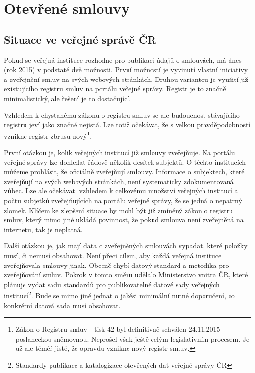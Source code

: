 \chapter{Otevřené smlouvy}
\label{sec:kap3}

\section{Situace ve veřejné správě ČR}

Pokud se veřejná instituce rozhodne pro publikaci údajů o smlouvách, má dnes (rok 2015) v podstatě dvě možnosti. První možností je vyvinutí vlastní iniciativy a zveřejnění smluv na svých webových stránkách. Druhou variantou je využití již existujícího registru smluv na portálu veřejné správy\cite{portalgov}. Registr je to značně minimalistický, ale řešení je to dostačující.

Vzhledem k chystanému zákonu o registru smluv se ale budoucnost stávajícího registru jeví jako značně nejistá. Lze totiž očekávat, že s velkou pravděpodobností vznikne registr zbrusu nový\footnote{Zákon o Registru smluv - tisk 42\cite{z42} byl definitivně schválen 24.11.2015 poslaneckou sněmovnou. Neprošel však ještě celým legislativním procesem. Je už ale téměř jisté, že opravdu vznikne nový registr smluv.}.

První otázkou je, kolik veřejných institucí již smlouvy zveřejňuje. Na portálu veřejné správy lze dohledat řádově několik desítek subjektů. O těchto institucích můžeme prohlásit, že oficiálně zveřejňují smlouvy. Informace o subjektech, které zveřejňují na svých webových stránkách, není systematicky zdokumentovaná vůbec. Lze ale očekávat, vzhledem k celkovému množství veřejných institucí a počtu subjetků zveřejňujících na portálu veřejné správy, že se jedná o nepatrný zlomek. Klíčem ke zlepšení situace by mohl být již zmíněný zákon o registru smluv, který mimo jiné ukládá povinnost, že pokud smlouva není zveřejněná na internetu, tak je neplatná.

Další otázkou je, jak mají data o zveřejněných smlouvách vypadat, které položky musí, či nemusí obsahovat. Není přeci cílem, aby každá veřejná instituce zveřejňovala smlouvy jinak. Obecně chybí datový standard a metodika pro zveřejňování smluv. Pokrok v tomto směru udělalo Ministerstvo vnitra ČR, které plánuje vydat sadu standardů pro publikovatelné datové sady veřejných institucí\footnote{Standardy publikace a katalogizace otevřených dat veřejné správy ČR\cite{odgov}}. Bude se mimo jiné jednat o jakési minimální nutné doporučení, co konkrétní datová sada musí obsahovat.

